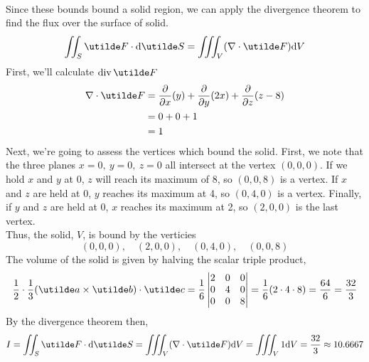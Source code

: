 \documentclass[a4paper,12pt]{report}
\begin{document}
\newpage
{}
\sol \\
Since these bounds bound a solid region, we can apply the divergence theorem to find the flux over the surface of solid.
$$
  \iint_S \ut{F}\cd\d\ut{S} = \iiint_V (\grad\cd\ut{F})\d V
$$
First, we'll calculate $\Div\ut{F}$
\begin{align*}
  \grad\cd\ut{F} &= \del{}{x}(y) + \del{}{y}(2x) + \del{}{z}(z-8) \\
    &= 0 + 0 + 1 \\
    &= 1
\end{align*}
Next, we're going to assess the vertices which bound the solid. First, we note that the three planes $x=0,\ y=0,\ z=0$ all intersect at the vertex $(0,0,0)$. If we hold $x$ and $y$ at 0, $z$ will reach its maximum of 8, so $(0,0,8)$ is a vertex. If $x$ and $z$ are held at 0, $y$ reaches its maximum at 4, so $(0,4,0)$ is a vertex. Finally, if $y$ and $z$ are held at 0, $x$ reaches its maximum at 2, so $(2,0,0)$ is the last vertex. \\
Thus, the solid, $V$, is bound by the verticies
$$
  (0,0,0),\quad (2,0,0),\quad (0,4,0),\quad (0,0,8)
$$
The volume of the solid is given by halving the scalar triple product,
$$
  \frac{1}{2}\cd\frac{1}{3}(\ut{a}\times\ut{b})\cd\ut{c} = \frac{1}{6}\begin{vmatrix} 2 & 0 & 0 \\ 0 & 4 & 0 \\ 0 & 0 & 8 \end{vmatrix} = \frac{1}{6}(2\cd4\cd8) = \frac{64}{6} = \frac{32}{3}
$$
By the divergence theorem then,
$$
  I = \iint_S \ut{F}\cd\d\ut{S} = \iiint_V (\grad\cd\ut{F})\d V = \iiint_V 1\d V = \frac{32}{3} \approx 10.6667
$$
\end{document}
